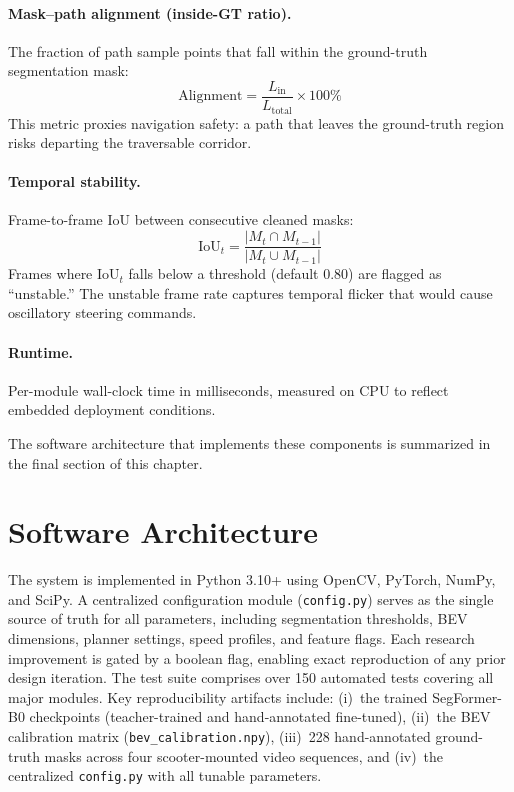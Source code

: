 \documentclass[12pt,letterpaper,oneside]{report}
\begin{document}
\paragraph{Mask--path alignment (inside-GT ratio).}
The fraction of path sample points that fall within the ground-truth segmentation mask:
\begin{equation}
\text{Alignment} = \frac{L_{\text{in}}}{L_{\text{total}}} \times 100\%
\end{equation}
This metric proxies navigation safety: a path that leaves the ground-truth region risks departing the traversable corridor.

\paragraph{Temporal stability.}
Frame-to-frame IoU between consecutive cleaned masks:
\begin{equation}
\text{IoU}_t = \frac{|M_t \cap M_{t-1}|}{|M_t \cup M_{t-1}|}
\end{equation}
Frames where $\text{IoU}_t$ falls below a threshold (default 0.80) are flagged as ``unstable.''  The unstable frame rate captures temporal flicker that would cause oscillatory steering commands.

\paragraph{Runtime.}
Per-module wall-clock time in milliseconds, measured on CPU to reflect embedded deployment conditions.

The software architecture that implements these components is summarized in the final section of this chapter.


\section{Software Architecture}
\label{sec:software_arch}

The system is implemented in Python 3.10+ using OpenCV, PyTorch, NumPy, and SciPy. A centralized configuration module (\texttt{config.py}) serves as the single source of truth for all parameters, including segmentation thresholds, BEV dimensions, planner settings, speed profiles, and feature flags. Each research improvement is gated by a boolean flag, enabling exact reproduction of any prior design iteration. The test suite comprises over 150 automated tests covering all major modules. Key reproducibility artifacts include: (i)~the trained SegFormer-B0 checkpoints (teacher-trained and hand-annotated fine-tuned), (ii)~the BEV calibration matrix (\texttt{bev\_calibration.npy}), (iii)~228 hand-annotated ground-truth masks across four scooter-mounted video sequences, and (iv)~the centralized \texttt{config.py} with all tunable parameters.
\end{document}
